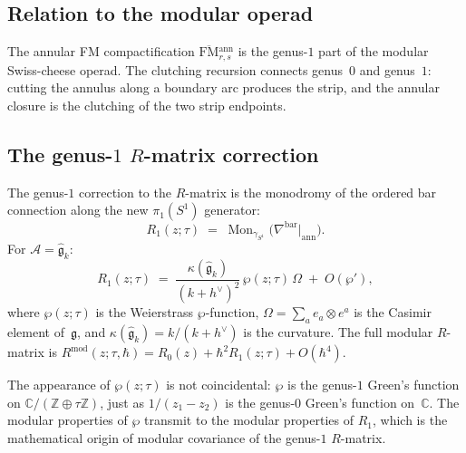 \documentclass[11pt]{article}
\newcommand{\cA}{\mathcal{A}}
\newcommand{\fg}{\mathfrak{g}}
\newcommand{\C}{\mathbb{C}}
\newcommand{\Z}{\mathbb{Z}}
\newcommand{\FM}{\mathrm{FM}}
\begin{document}
\subsection{Relation to the modular operad}
\label{subsec:annular-modular-wn}

\begin{theorem}
\label{thm:annular-modular-wn}
The annular FM compactification
$\overline{\FM}{}^{\mathrm{ann}}_{r,s}$ is the genus-$1$ part
of the modular Swiss-cheese operad.  The clutching recursion
connects genus~$0$ and genus~$1$: cutting the annulus along a
boundary arc produces the strip, and the annular closure is the
clutching of the two strip endpoints.
\end{theorem}

\subsection{The genus-$1$ $R$-matrix correction}
\label{subsec:genus1-R-matrix-wn}

\begin{theorem}
\label{thm:genus1-R-matrix-wn}
The genus-$1$ correction to the $R$-matrix is the monodromy of
the ordered bar connection along the new $\pi_1(S^1)$ generator:
\[
R_1(z;\tau)
\;=\;
\operatorname{Mon}_{\gamma_{S^1}}
\bigl(\nabla^{\mathrm{bar}}\big|_{\mathrm{ann}}\bigr).
\]
For $\cA=\widehat{\fg}_k$:
\[
R_1(z;\tau)
\;=\;
\frac{\kappa(\widehat{\fg}_k)}{(k+h^\vee)^2}\,
\wp(z;\tau)\,\Omega
\;+\;
O(\wp'),
\]
where $\wp(z;\tau)$ is the Weierstrass $\wp$-function,
$\Omega=\sum_a e_a\otimes e^a$ is the Casimir element
of~$\fg$, and $\kappa(\widehat{\fg}_k)=k/(k+h^\vee)$ is the
curvature.  The full modular $R$-matrix is
$R^{\mathrm{mod}}(z;\tau,\hbar)=R_0(z)+\hbar^2 R_1(z;\tau)+O(\hbar^4)$.
\end{theorem}

\begin{remark}
The appearance of $\wp(z;\tau)$ is not coincidental: $\wp$ is the
genus-$1$ Green's function on $\C/(\Z\oplus\tau\Z)$, just as
$1/(z_1-z_2)$ is the genus-$0$ Green's function on~$\C$.  The
modular properties of $\wp$ transmit to the modular
properties of $R_1$, which is the mathematical origin of modular
covariance of the genus-$1$ $R$-matrix.
\end{remark}


\end{document}
